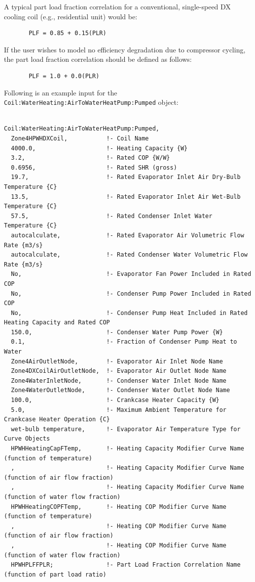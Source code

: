 A typical part load fraction correlation for a conventional, single-speed DX cooling coil (e.g., residential unit) would be:

\begin{lstlisting}
       PLF = 0.85 + 0.15(PLR)
\end{lstlisting}

If the user wishes to model no efficiency degradation due to compressor cycling, the part load fraction correlation should be defined as follows:

\begin{lstlisting}
       PLF = 1.0 + 0.0(PLR)
\end{lstlisting}

Following is an example input for the \lstinline!Coil:WaterHeating:AirToWaterHeatPump:Pumped! object:

\begin{lstlisting}

Coil:WaterHeating:AirToWaterHeatPump:Pumped,
  Zone4HPWHDXCoil,           !- Coil Name
  4000.0,                    !- Heating Capacity {W}
  3.2,                       !- Rated COP {W/W}
  0.6956,                    !- Rated SHR (gross)
  19.7,                      !- Rated Evaporator Inlet Air Dry-Bulb Temperature {C}
  13.5,                      !- Rated Evaporator Inlet Air Wet-Bulb Temperature {C}
  57.5,                      !- Rated Condenser Inlet Water Temperature {C}
  autocalculate,             !- Rated Evaporator Air Volumetric Flow Rate {m3/s}
  autocalculate,             !- Rated Condenser Water Volumetric Flow Rate {m3/s}
  No,                        !- Evaporator Fan Power Included in Rated COP
  No,                        !- Condenser Pump Power Included in Rated COP
  No,                        !- Condenser Pump Heat Included in Rated Heating Capacity and Rated COP
  150.0,                     !- Condenser Water Pump Power {W}
  0.1,                       !- Fraction of Condenser Pump Heat to Water
  Zone4AirOutletNode,        !- Evaporator Air Inlet Node Name
  Zone4DXCoilAirOutletNode,  !- Evaporator Air Outlet Node Name
  Zone4WaterInletNode,       !- Condenser Water Inlet Node Name
  Zone4WaterOutletNode,      !- Condenser Water Outlet Node Name
  100.0,                     !- Crankcase Heater Capacity {W}
  5.0,                       !- Maximum Ambient Temperature for Crankcase Heater Operation {C}
  wet-bulb temperature,      !- Evaporator Air Temperature Type for Curve Objects
  HPWHHeatingCapFTemp,       !- Heating Capacity Modifier Curve Name (function of temperature)
  ,                          !- Heating Capacity Modifier Curve Name (function of air flow fraction)
  ,                          !- Heating Capacity Modifier Curve Name (function of water flow fraction)
  HPWHHeatingCOPFTemp,       !- Heating COP Modifier Curve Name (function of temperature)
  ,                          !- Heating COP Modifier Curve Name (function of air flow fraction)
  ,                          !- Heating COP Modifier Curve Name (function of water flow fraction)
  HPWHPLFFPLR;               !- Part Load Fraction Correlation Name (function of part load ratio)
\end{lstlisting}

